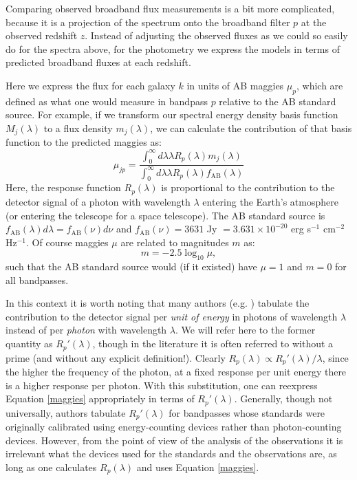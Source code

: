 \documentclass[10pt,preprint]{aastex}
\begin{document}
Comparing observed broadband flux measurements is a bit more
complicated, because it is a projection of the spectrum onto the
broadband filter $p$ at the observed redshift $z$. Instead of
adjusting the observed fluxes as we could so easily do for the spectra
above, for the photometry we express the models in terms of predicted
broadband fluxes at each redshift.

Here we express the flux for each galaxy $k$ in units of AB maggies
$\mu_p$, which are defined as what one would measure in bandpass $p$
relative to the AB standard source. For example, if we transform our
spectral energy density basis function $M_{j}(\lambda)$ to a flux
density $m_{j}(\lambda)$, we can calculate the contribution of
that basis function to the predicted maggies as:
\begin{equation}
\label{maggies}
\mu_{jp} = 
\frac{\int_0^{\infty} d\lambda \lambda R_p(\lambda) {m}_{j}(\lambda)}
{\int_0^\infty d\lambda \lambda R_p(\lambda) f_{\mathrm{AB}}(\lambda) }
\end{equation}
Here, the response function $R_p(\lambda)$ is proportional to the
contribution to the detector signal of a photon with wavelength
$\lambda$ entering the Earth's atmosphere (or entering the telescope
for a space telescope). The AB standard source is $f_{
\mathrm{AB}}(\lambda) d\lambda = f_{
\mathrm{AB}} (\nu) d\nu$ and $f_{\mathrm{AB}}(\nu)=3631$ Jy $= 3.631 \times
10^{-20}$ erg s$^{-1}$ cm$^{-2}$ Hz$^{-1}$. Of course maggies $\mu$
are related to magnitudes $m$ as:
\begin{equation}
m = -2.5 \log_{10} \mu, 
\end{equation}
such that the AB standard source would (if it existed) have $\mu=1$
and $m=0$ for all bandpasses.

In this context it is worth noting that many authors
(e.g. \citealt{bessell90a}) tabulate the contribution to the detector
signal per {\it unit of energy} in photons of wavelength $\lambda$
instead of per {\it photon} with wavelength $\lambda$.  We will refer here
to the former quantity as $R_p'(\lambda)$, though in the literature it is
often referred to without a prime (and without any explicit
definition!). Clearly $R_p(\lambda) \propto R_p'(\lambda)/\lambda$,
since the higher the frequency of the photon, at a fixed response per
unit energy there is a higher response per photon. With this
substitution, one can reexpress Equation
\ref{maggies} appropriately in terms of $R_p'(\lambda)$.  
Generally, though not universally, authors tabulate $R_p'(\lambda)$
for bandpasses whose standards were originally calibrated using
energy-counting devices rather than photon-counting devices. However,
from the point of view of the analysis of the observations it is
irrelevant what the devices used for the standards and the
observations are, as long as one calculates $R_p(\lambda)$ and uses
Equation \ref{maggies}.  
\end{document}
